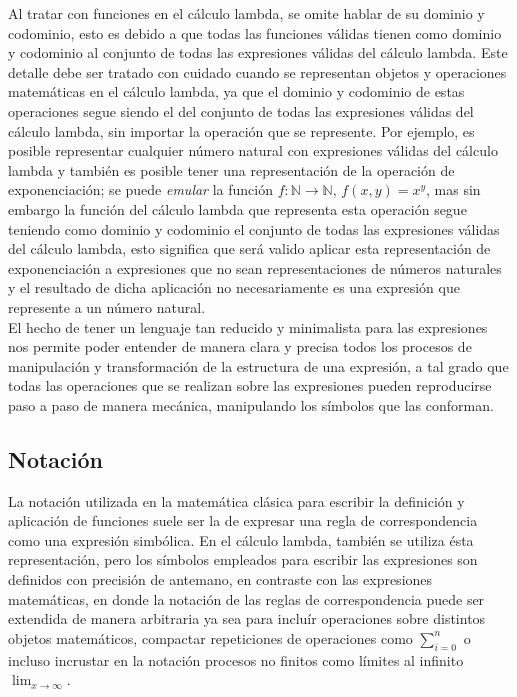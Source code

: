 Al tratar con funciones en el cálculo lambda, se omite hablar de su dominio y
codominio, esto es debido a que todas las funciones válidas tienen como dominio
y codominio al conjunto de todas las expresiones válidas del cálculo lambda.
Este detalle debe ser tratado con cuidado cuando se representan objetos y
operaciones matemáticas en el cálculo lambda, ya que el dominio y codominio de
estas operaciones segue siendo el del conjunto de todas las expresiones válidas
del cálculo lambda, sin importar la operación que se represente. Por ejemplo, es
posible representar cualquier número natural con expresiones válidas del cálculo
lambda y también es posible tener una representación de la operación de
exponenciación; se puede \emph{emular} la función \(f : \mathbb{N} \to
\mathbb{N}\), \(f(x,y)=x^y\), mas sin embargo la función del cálculo lambda que
representa esta operación segue teniendo como dominio y codominio el conjunto de
todas las expresiones válidas del cálculo lambda, esto significa que será valido
aplicar esta representación de exponenciación a expresiones que no sean
representaciones de números naturales y el resultado de dicha aplicación no
necesariamente es una expresión que represente a un número natural.\\

El hecho de tener un lenguaje tan reducido y minimalista para las expresiones
nos permite poder entender de manera clara y precisa todos los procesos de
manipulación y transformación de la estructura de una expresión, a tal grado que
todas las operaciones que se realizan sobre las expresiones pueden reproducirse
paso a paso de manera mecánica, manipulando los símbolos que las conforman.\\

\subsection{Notación} \label{sec:1.1.1}

La notación utilizada en la matemática clásica para escribir la definición y
aplicación de funciones suele ser la de expresar una regla de correspondencia
como una expresión simbólica. En el cálculo lambda, también se utiliza ésta
representación, pero los símbolos empleados para escribir las expresiones son
definidos con precisión de antemano, en contraste con las expresiones
matemáticas, en donde la notación de las reglas de correspondencia puede ser
extendida de manera arbitraria ya sea para incluír operaciones sobre distintos
objetos matemáticos, compactar repeticiones de operaciones como \(\sum_{i=0}^n\)
o incluso incrustar en la notación procesos no finitos como límites al infinito
\(\lim_{x\to \infty}\).\\

